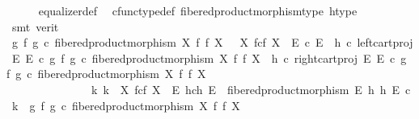 \begin{isabellebody}
\ \ \ \ \isamarkupfalse%
\ equalizer{\isacharunderscore}{\kern0pt}def\ \isamarkupfalse%
\ cfunc{\isacharunderscore}{\kern0pt}type{\isacharunderscore}{\kern0pt}def\ fibered{\isacharunderscore}{\kern0pt}product{\isacharunderscore}{\kern0pt}morphism{\isacharunderscore}{\kern0pt}type\ h{\isacharunderscore}{\kern0pt}type\ \isamarkupfalse%
\ {\isacharparenleft}{\kern0pt}smt\ {\isacharparenleft}{\kern0pt}verit{\isacharparenright}{\kern0pt}{\isacharparenright}{\kern0pt}\isanewline
\ \ \isamarkupfalse%
\ \isamarkupfalse%
\ {\isachardoublequoteopen}{\isacharparenleft}{\kern0pt}g\ {\isasymtimes}\isactrlsub f\ g{\isacharparenright}{\kern0pt}\ {\isasymcirc}\isactrlsub c\ fibered{\isacharunderscore}{\kern0pt}product{\isacharunderscore}{\kern0pt}morphism\ X\ f\ f\ X\ \ {\isacharcolon}{\kern0pt}\ X\ \isactrlbsub f\isactrlesub {\isasymtimes}\isactrlsub c\isactrlbsub f\isactrlesub \ X\ {\isasymrightarrow}\ E\ {\isasymtimes}\isactrlsub c\ E\ {\isasymand}\ {\isacharparenleft}{\kern0pt}h\ {\isasymcirc}\isactrlsub c\ left{\isacharunderscore}{\kern0pt}cart{\isacharunderscore}{\kern0pt}proj\ E\ E{\isacharparenright}{\kern0pt}\ {\isasymcirc}\isactrlsub c\ {\isacharparenleft}{\kern0pt}g\ {\isasymtimes}\isactrlsub f\ g{\isacharparenright}{\kern0pt}\ {\isasymcirc}\isactrlsub c\ fibered{\isacharunderscore}{\kern0pt}product{\isacharunderscore}{\kern0pt}morphism\ X\ f\ f\ X\ {\isacharequal}{\kern0pt}\ {\isacharparenleft}{\kern0pt}h\ {\isasymcirc}\isactrlsub c\ right{\isacharunderscore}{\kern0pt}cart{\isacharunderscore}{\kern0pt}proj\ E\ E{\isacharparenright}{\kern0pt}\ {\isasymcirc}\isactrlsub c\ {\isacharparenleft}{\kern0pt}g\ {\isasymtimes}\isactrlsub f\ g{\isacharparenright}{\kern0pt}\ {\isasymcirc}\isactrlsub c\ fibered{\isacharunderscore}{\kern0pt}product{\isacharunderscore}{\kern0pt}morphism\ X\ f\ f\ X\ {\isasymlongrightarrow}\isanewline
\ \ \ \ \ \ \ \ \ \ \ \ \ \ \ {\isacharparenleft}{\kern0pt}{\isasymexists}{\isacharbang}{\kern0pt}k{\isachardot}{\kern0pt}\ k\ {\isacharcolon}{\kern0pt}\ X\ \isactrlbsub f\isactrlesub {\isasymtimes}\isactrlsub c\isactrlbsub f\isactrlesub \ X\ {\isasymrightarrow}\ E\ \isactrlbsub h\isactrlesub {\isasymtimes}\isactrlsub c\isactrlbsub h\isactrlesub \ E\ {\isasymand}\ fibered{\isacharunderscore}{\kern0pt}product{\isacharunderscore}{\kern0pt}morphism\ E\ h\ h\ E\ {\isasymcirc}\isactrlsub c\ k\ {\isacharequal}{\kern0pt}\ {\isacharparenleft}{\kern0pt}g\ {\isasymtimes}\isactrlsub f\ g{\isacharparenright}{\kern0pt}\ {\isasymcirc}\isactrlsub c\ fibered{\isacharunderscore}{\kern0pt}product{\isacharunderscore}{\kern0pt}morphism\ X\ f\ f\ X{\isacharparenright}{\kern0pt}{\isachardoublequoteclose}\isanewline

\end{isabellebody}
